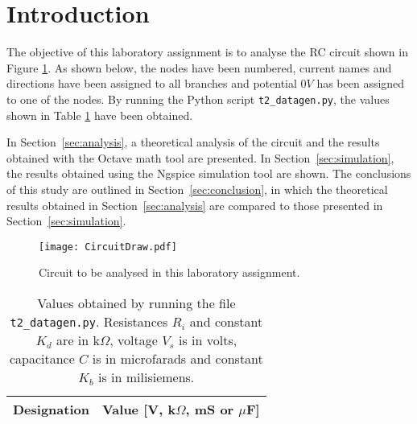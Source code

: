 \section{Introduction}
\label{sec:introduction}

The objective of this laboratory assignment is to analyse the RC circuit shown in Figure \ref{fig:CircuitDraw}. As shown below, the nodes have been numbered, current names and directions have been assigned to all branches and potential $0V$ has been assigned to one of the nodes. By running the Python script \texttt{t2\_datagen.py}, the values shown in Table \ref{tab:GivenValues} have been obtained.
\par
In Section~\ref{sec:analysis}, a theoretical analysis of the circuit and the results obtained with the Octave math tool are presented. In Section~\ref{sec:simulation}, the results obtained using the Ngspice simulation tool are shown. The conclusions of this study are outlined in Section~\ref{sec:conclusion}, in which the theoretical results obtained in Section~\ref{sec:analysis} are compared to those presented in Section~\ref{sec:simulation}.

\begin{figure}[H] \centering
  \texttt{[image: CircuitDraw.pdf]}
  \caption{Circuit to be analysed in this laboratory assignment.}
  \label{fig:CircuitDraw}
\end{figure}


\begin{table}[H]
  \centering
  \begin{tabular}{|c|c|}
    \hline    
    {\bf Designation} & {\bf Value [V, k$\Omega$, mS or $\mu$F]} \\ \hline
    
  \end{tabular}
  \caption{Values obtained by running the file \texttt{t2\_datagen.py}. Resistances $R_i$ and constant $K_d$ are in k$\Omega$, voltage $V_s$ is in volts, capacitance $C$ is in microfarads and constant $K_b$ is in milisiemens.}
  \label{tab:GivenValues}
\end{table}

